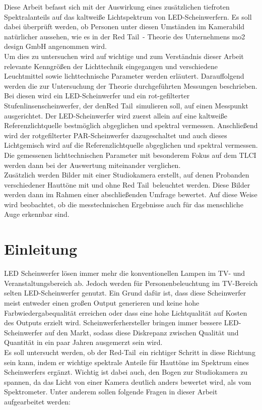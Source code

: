 Diese Arbeit befasst sich mit der Auswirkung eines zusätzlichen tiefroten Spektralanteils auf das kaltweiße Lichtspektrum von LED-Scheinwerfern. Es soll dabei überprüft werden, ob Personen unter diesen Umständen im Kamerabild natürlicher aussehen, wie es in der \glqq Red Tail\grqq\ - Theorie des Unternehmens mo2 design GmbH angenommen wird.\\
Um dies zu untersuchen wird auf wichtige und zum Verständnis dieser Arbeit relevante Kenngrößen der Lichttechnik eingegangen und verschiedene Leuchtmittel sowie lichttechnische Parameter werden erläutert. Darauffolgend werden die zur Untersuchung der Theorie durchgeführten Messungen beschrieben. Bei diesen wird ein LED-Scheinwerfer und ein rot-gefilterter Stufenlinsenscheinwerfer, der den\glqq Red Tail\grqq\ simulieren soll, auf einen Messpunkt ausgerichtet. Der LED-Scheinwerfer wird zuerst allein auf eine kaltweiße Referenzlichtquelle bestmöglich abgeglichen und spektral vermessen. Anschließend wird der rotgefilterter PAR-Scheinwerfer dazugeschaltet und auch dieses Lichtgemisch wird auf die Referenzlichtquelle abgeglichen und spektral vermessen. Die gemessenen lichttechnischen Parameter mit besonderem Fokus auf dem TLCI werden dann bei der Auswertung miteinander verglichen.\\
Zusätzlich werden Bilder mit einer Studiokamera erstellt, auf denen Probanden verschiedener Hauttöne mit und ohne \glqq Red Tail\grqq\ beleuchtet werden. Diese Bilder werden dann im Rahmen einer  abschließenden Umfrage bewertet. Auf diese Weise wird beobachtet, ob die messtechnischen Ergebnisse auch für das menschliche Auge erkennbar sind. 


\chapter{Einleitung}
LED Scheinwerfer lösen immer mehr die konventionellen Lampen im TV- und Veranstaltungsbereich ab. Jedoch werden für Personenbeleuchtung im TV-Bereich selten LED-Scheinwerfer genutzt. Ein Grund dafür ist, dass diese Scheinwerfer meist entweder einen großen Output generieren und keine hohe Farbwiedergabequalität erreichen oder dass eine hohe Lichtqualität auf Kosten des Outputs erzielt wird. Scheinwerferhersteller bringen immer bessere LED-Scheinwerfer auf den Markt, sodass diese Diskrepanz zwischen Qualität und Quantität in ein paar Jahren ausgemerzt sein wird.\\
Es soll untersucht werden, ob der \glqq Red-Tail\grqq\ ein richtiger Schritt in diese Richtung sein kann, indem er wichtige spektrale Anteile für Hauttöne im Spektrum eines Scheinwerfers ergänzt. Wichtig ist dabei auch, den Bogen zur Studiokamera zu spannen, da das Licht von einer Kamera deutlich anders bewertet wird, als vom Spektrometer. Unter anderem sollen folgende Fragen in dieser Arbeit aufgearbeitet werden:

